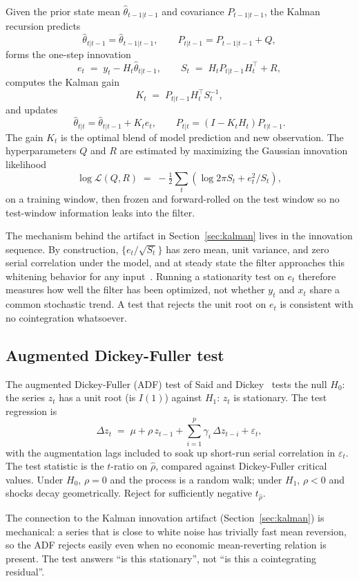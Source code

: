 \documentclass[11pt]{article}
\begin{document}
Given the prior state mean $\hat{\theta}_{t-1|t-1}$ and covariance $P_{t-1|t-1}$, the
Kalman recursion predicts
\[
\hat{\theta}_{t|t-1} = \hat{\theta}_{t-1|t-1}, \qquad P_{t|t-1} = P_{t-1|t-1} + Q,
\]
forms the one-step innovation
\[
e_t \;=\; y_t - H_t \hat{\theta}_{t|t-1}, \qquad S_t \;=\; H_t P_{t|t-1} H_t^\top + R,
\]
computes the Kalman gain
\[
K_t \;=\; P_{t|t-1} H_t^\top S_t^{-1},
\]
and updates
\[
\hat{\theta}_{t|t} = \hat{\theta}_{t|t-1} + K_t e_t, \qquad P_{t|t} = (I - K_t H_t) P_{t|t-1}.
\]
The gain $K_t$ is the optimal blend of model prediction and new observation. The
hyperparameters $Q$ and $R$ are estimated by maximizing the Gaussian innovation likelihood
\[
\log \mathcal{L}(Q, R) \;=\; -\tfrac{1}{2} \sum_{t} \left( \log 2\pi S_t + e_t^2 / S_t \right),
\]
on a training window, then frozen and forward-rolled on the test window so no test-window
information leaks into the filter.

The mechanism behind the artifact in Section~\ref{sec:kalman} lives in the innovation
sequence. By construction, $\{e_t / \sqrt{S_t}\}$ has zero mean, unit variance, and zero
serial correlation under the model, and at steady state the filter approaches this
whitening behavior for any input~\cite{harvey1989structural}. Running a stationarity test
on $e_t$ therefore measures how well the filter has been optimized, not whether $y_t$ and
$x_t$ share a common stochastic trend. A test that rejects the unit root on $e_t$ is
consistent with no cointegration whatsoever.

\subsection{Augmented Dickey-Fuller test}
\label{app:adf}

The augmented Dickey-Fuller (ADF) test of Said and Dickey~\cite{saiddickey1984} tests the
null $H_0$: the series $z_t$ has a unit root (is $I(1)$) against $H_1$: $z_t$ is
stationary. The test regression is
\[
\Delta z_t \;=\; \mu + \rho \, z_{t-1} + \sum_{i=1}^{p} \gamma_i \, \Delta z_{t-i} + \varepsilon_t,
\]
with the augmentation lags included to soak up short-run serial correlation in
$\varepsilon_t$. The test statistic is the $t$-ratio on $\hat{\rho}$, compared against
Dickey-Fuller critical values. Under $H_0$, $\rho = 0$ and the process is a random walk;
under $H_1$, $\rho < 0$ and shocks decay geometrically. Reject for sufficiently negative
$t_{\hat\rho}$.

The connection to the Kalman innovation artifact (Section~\ref{sec:kalman}) is mechanical: a
series that is close to white noise has trivially fast mean reversion, so the ADF rejects
easily even when no economic mean-reverting relation is present. The test answers ``is this
stationary'', not ``is this a cointegrating residual''.
\end{document}
